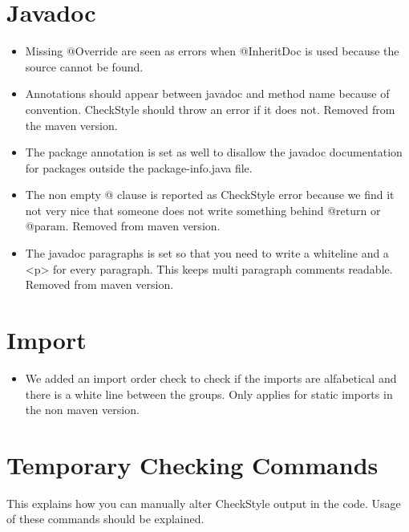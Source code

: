 \documentclass[11pt,a4paper]{report}
\begin{document}
\section{Javadoc}

\begin{itemize}

\item Missing @Override are seen as errors when @InheritDoc is used because the source cannot be found.

\item Annotations should appear between javadoc and method name because of convention. CheckStyle should throw an error if it does not. Removed from the maven version.

\item The package annotation is set as well to disallow the javadoc documentation for packages outside the package-info.java file.

\item The non empty @ clause is reported as CheckStyle error because we find it not very nice that someone does not write something behind @return or @param. Removed from maven version.

\item The javadoc paragraphs is set so that you need to write a whiteline and a <p> for every paragraph. This keeps multi paragraph comments readable. Removed from maven version.

\end{itemize}

\section{Import}

\begin{itemize}

\item We added an import order check to check if the imports are alfabetical and there is a white line between the groups. Only applies for static imports in the non maven version.

\end{itemize}

\section{Temporary Checking Commands}

This explains how you can manually alter CheckStyle output in the code. Usage of these commands should be explained.
\end{document}
